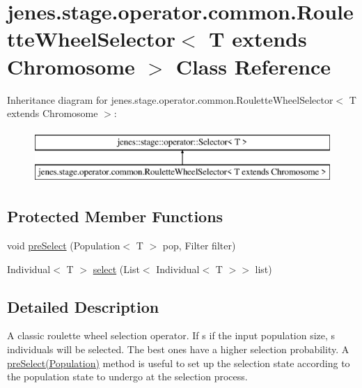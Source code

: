 \hypertarget{classjenes_1_1stage_1_1operator_1_1common_1_1_roulette_wheel_selector_3_01_t_01extends_01_chromosome_01_4}{\section{jenes.\-stage.\-operator.\-common.\-Roulette\-Wheel\-Selector$<$ T extends Chromosome $>$ Class Reference}
\label{classjenes_1_1stage_1_1operator_1_1common_1_1_roulette_wheel_selector_3_01_t_01extends_01_chromosome_01_4}
}
Inheritance diagram for jenes.\-stage.\-operator.\-common.\-Roulette\-Wheel\-Selector$<$ T extends Chromosome $>$\-:\begin{figure}[H]
\begin{center}
\leavevmode
\includegraphics[height=2.000000cm]{classjenes_1_1stage_1_1operator_1_1common_1_1_roulette_wheel_selector_3_01_t_01extends_01_chromosome_01_4}
\end{center}
\end{figure}
\subsection*{Protected Member Functions}
\begin{DoxyCompactItemize}
\item 
void \hyperlink{classjenes_1_1stage_1_1operator_1_1common_1_1_roulette_wheel_selector_3_01_t_01extends_01_chromosome_01_4_a13a6b76fa77779367d05a063ff6191bf}{pre\-Select} (Population$<$ T $>$ pop, Filter filter)
\item 
Individual$<$ T $>$ \hyperlink{classjenes_1_1stage_1_1operator_1_1common_1_1_roulette_wheel_selector_3_01_t_01extends_01_chromosome_01_4_ad74c66e053cb97c75ce8a9f78a8208e5}{select} (List$<$ Individual$<$ T $>$$>$ list)
\end{DoxyCompactItemize}


\subsection{Detailed Description}
A classic roulette wheel selection operator. If s if the input population size, s individuals will be selected. The best ones have a higher selection probability. A \hyperlink{}{pre\-Select(\-Population)} method is useful to set up the selection state according to the population state to undergo at the selection process. 


